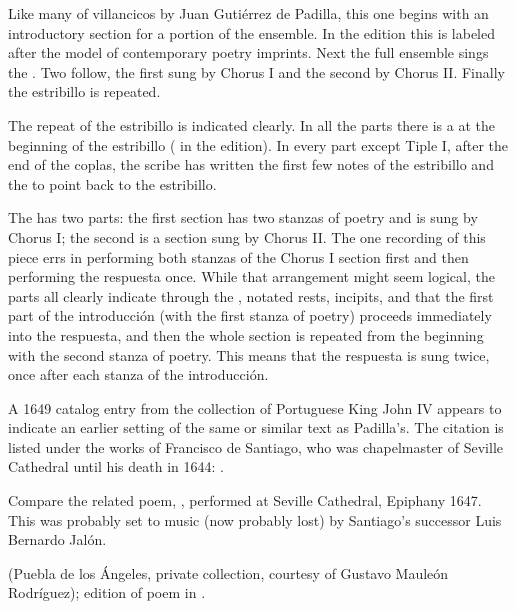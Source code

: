 
Like many of villancicos by Juan Gutiérrez de Padilla, this one begins with an
introductory section for a portion of the ensemble.
In the edition this is labeled  after the model of 
contemporary poetry imprints.
Next the full ensemble sings the .
Two  follow, the first sung by Chorus I and the second by 
Chorus II. 
Finally the estribillo is repeated.

The repeat of the estribillo is indicated clearly.
In all the parts there is a  at the beginning of the 
estribillo ( in the edition).
In every part except Tiple I, after the end of the coplas, the scribe has 
written the first few notes of the estribillo and the  to point 
back to the estribillo.

The  has two parts: the first section has two stanzas of 
poetry and is sung by Chorus I; the second is a  
section sung by Chorus II.
The one recording of this piece errs in performing both stanzas of the Chorus I 
section first and then performing the respuesta once.
While that arrangement might seem logical, the parts all clearly indicate 
through the , notated rests, incipits, and 
 that the first part of the introducción (with the first stanza 
of poetry) proceeds immediately into the respuesta, and then the whole section 
is repeated from the beginning with the second stanza of poetry.
This means that the respuesta is sung twice, once after each stanza of the 
introducción.


A 1649 catalog entry from the collection of Portuguese King John IV appears to 
indicate an earlier setting of the same or similar text as Padilla's.
The citation is listed under the works of Francisco de Santiago, who was 
chapelmaster of Seville Cathedral until his death in 1644: .%
  \autocite[caixão 26, no.~674]{JohnIV:Catalog}

Compare the related poem, , performed at 
Seville Cathedral, Epiphany 1647.
This was probably set to music (now probably lost) by Santiago's successor Luis
Bernardo Jalón.%
\begin{Footnote}
     (Puebla de los Ángeles, private 
    collection, courtesy of Gustavo Mauleón Rodríguez); 
    edition of poem in \autocite[209]{Cashner:PhD}.
\end{Footnote}

\criticalnotesheader


